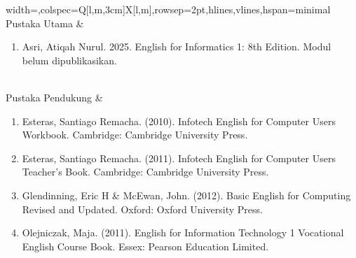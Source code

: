 \begin{longtblr}{width=\textwidth,colspec={Q[l,m,3cm]X[l,m]},rowsep=2pt,hlines,vlines,hspan=minimal}
Pustaka Utama & \begin{enumerate}\item Asri, Atiqah Nurul. 2025. English for Informatics 1: 8th Edition. Modul belum dipublikasikan.\end{enumerate} \\
Pustaka Pendukung & \begin{enumerate}\item Esteras, Santiago Remacha. (2010). Infotech English for Computer Users Workbook. Cambridge: Cambridge University Press.\item Esteras, Santiago Remacha. (2011). Infotech English for Computer Users Teacher's Book. Cambridge: Cambridge University Press.\item Glendinning, Eric H \& McEwan, John. (2012). Basic English for Computing Revised and Updated. Oxford: Oxford University Press.\item Olejniczak, Maja. (2011). English for Information Technology 1 Vocational English Course Book. Essex: Pearson Education Limited.\end{enumerate} \\
\end{longtblr}

